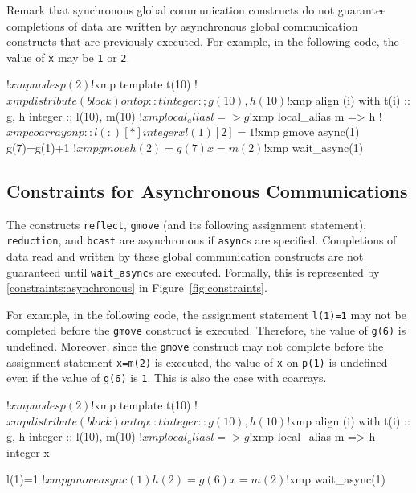 Remark that synchronous global communication constructs do not
guarantee completions of data are written by asynchronous global
communication constructs that are previously executed.  For example,
in the following code, the value of \texttt{x} may be \texttt{1} or
\texttt{2}.

\begin{center}
\begin{XFexample}
!$xmp nodes p(2)
!$xmp template t(10)
!$xmp distribute (block) onto p :: t
      integer :; g(10), h(10)
!$xmp align (i) with t(i) :: g, h
      integer :; l(10), m(10)
!$xmp local_alias l => g
!$xmp local_alias m => h
!$xmp coarray on p :: l(:)[*]
      integer x

      l(1)[2]=1
!$xmp gmove async(1)
      g(7)=g(1)+1
!$xmp gmove
      h(2)=g(7)
      x=m(2)
!$xmp wait_async(1)
\end{XFexample}
\end{center}

\subsection{Constraints for Asynchronous Communications}

The constructs \texttt{reflect}, \texttt{gmove} (and its following
assignment statement), \texttt{reduction}, and \texttt{bcast} are
asynchronous if \texttt{async}s are specified.  Completions of data
read and written by these global communication constructs are not
guaranteed until \texttt{wait\_async}s are executed.
Formally, this is represented by
\ref{constraints:asynchronous} in Figure~\ref{fig:constraints}.

For example, in the following code, the assignment statement \texttt{l(1)=1} may
not be completed before the \texttt{gmove} construct is executed.
Therefore, the value of \texttt{g(6)} is undefined.  Moreover, since
the \texttt{gmove} construct may not complete before the assignment statement
\texttt{x=m(2)} is executed, the value of \texttt{x} on \texttt{p(1)}
is undefined even if the value of \texttt{g(6)} is \texttt{1}.  This
is also the case with coarrays.
\begin{center}
\begin{XFexample}
!$xmp nodes p(2)
!$xmp template t(10)
!$xmp distribute (block) onto p :: t
      integer :: g(10), h(10)
!$xmp align (i) with t(i) :: g, h
      integer :: l(10), m(10)
!$xmp local_alias l => g
!$xmp local_alias m => h
      integer x

      l(1)=1
!$xmp gmove async(1)
      h(2)=g(6)
      x=m(2)
!$xmp wait_async(1)
\end{XFexample}
\end{center}

